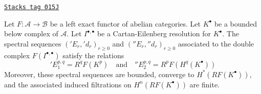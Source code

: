 \begin{lemma}
\label{derived-lemma-two-ss-complex-functor}
\href{https://stacks.math.columbia.edu/tag/015J}{\texttt{Stacks tag 015J}}

Let $F : \mathcal{A} \to \mathcal{B}$ be a left exact functor of
abelian categories.
Let $K^\bullet$ be a bounded below complex of $\mathcal{A}$.
Let $I^{\bullet, \bullet}$ be a Cartan-Eilenberg resolution
for $K^\bullet$. The spectral sequences
$({}'E_r, {}'d_r)_{r \geq 0}$ and $({}''E_r, {}''d_r)_{r \geq 0}$
associated to the double complex $F(I^{\bullet, \bullet})$
satisfy the relations
$$
{}'E_1^{p, q} = R^qF(K^p)
\quad
\text{and}
\quad
{}''E_2^{p, q} = R^pF(H^q(K^\bullet))
$$
Moreover, these spectral sequences are bounded, converge to
$H^*(RF(K^\bullet))$, and the associated induced filtrations on
$H^n(RF(K^\bullet))$ are finite.
\end{lemma}

